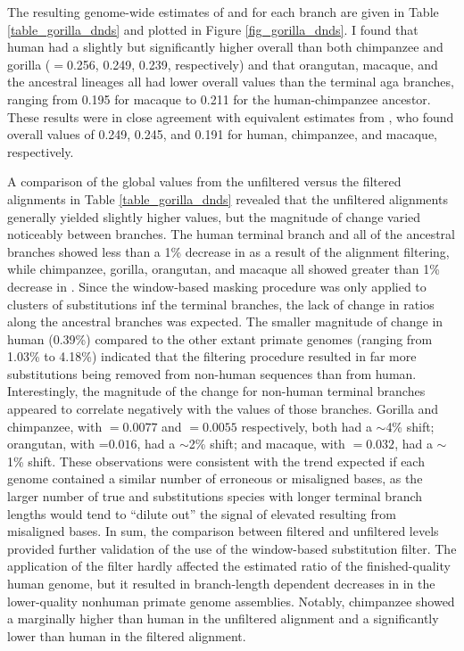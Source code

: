 The resulting genome-wide estimates of \ds and \dnds for each branch
are given in Table \ref{table_gorilla_dnds} and plotted in Figure
\ref{fig_gorilla_dnds}. I found that human had a slightly but
significantly higher overall \dnds than both chimpanzee and gorilla
(\dnds$=$0.256, 0.249, 0.239, respectively) and that orangutan,
macaque, and the ancestral lineages all had lower overall \dnds values
than the terminal \ac{aga} branches, ranging from 0.195 for macaque to
0.211 for the human-chimpanzee ancestor. These results were in close
agreement with equivalent estimates from \citet{Kosiol2008}, who found
overall \dnds values of 0.249, 0.245, and 0.191 for human, chimpanzee,
and macaque, respectively.

A comparison of the global \dnds values from the unfiltered versus the
filtered alignments in Table \ref{table_gorilla_dnds} revealed that
the unfiltered alignments generally yielded slightly higher \dnds
values, but the magnitude of change varied noticeably between
branches. The human terminal branch and all of the ancestral branches
showed less than a 1\% decrease in \dnds as a result of the alignment
filtering, while chimpanzee, gorilla, orangutan, and macaque all
showed greater than 1\% decrease in \dnds. Since the window-based
masking procedure was only applied to clusters of substitutions inf
the terminal branches, the lack of change in \dnds ratios along the
ancestral branches was expected. The smaller magnitude of change in
human (0.39\%) compared to the other extant primate genomes (ranging
from 1.03\% to 4.18\%) indicated that the filtering procedure resulted
in far more \nsyn substitutions being removed from non-human sequences
than from human. Interestingly, the magnitude of the \dnds change for
non-human terminal branches appeared to correlate negatively with the
\ds values of those branches. Gorilla and chimpanzee, with \ds$=0.0077$ and
\ds$=0.0055$ respectively, both had a $\sim$4\% shift; orangutan, with
\ds=$0.016$, had a $\sim$2\% shift; and macaque, with \ds$=0.032$, had
a $\sim$1\% shift. These observations were consistent with the trend
expected if each genome contained a similar number of erroneous or
misaligned bases, as the larger number of true \nsyn and \syn
substitutions species with longer terminal branch lengths would tend
to ``dilute out'' the signal of elevated \dnds resulting from
misaligned bases. In sum, the comparison between filtered and
unfiltered \dnds levels provided further validation of the use of the
window-based substitution filter. The application of the filter hardly
affected the estimated \dnds ratio of the finished-quality human
genome, but it resulted in branch-length dependent decreases in \dnds
in the lower-quality nonhuman primate genome assemblies. Notably,
chimpanzee showed a marginally higher \dnds than human in the
unfiltered alignment and a significantly lower \dnds than human in the
filtered alignment.

